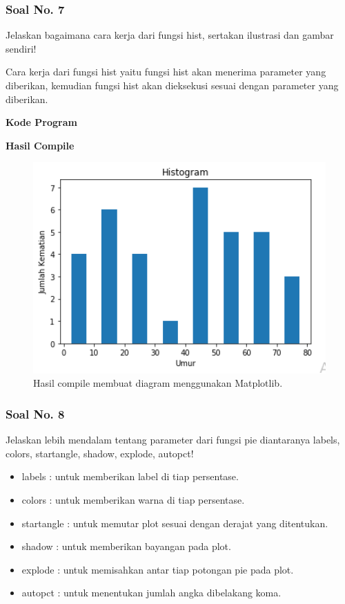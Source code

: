 \subsubsection{Soal No. 7}
\hfill \break
Jelaskan bagaimana cara kerja dari fungsi hist, sertakan ilustrasi dan gambar sendiri!

\hfill \break
Cara kerja dari fungsi hist yaitu fungsi hist akan menerima parameter yang diberikan, kemudian fungsi hist akan dieksekusi sesuai dengan parameter yang diberikan.

\hfill \break
\textbf{Kode Program}



\hfill \break
\textbf{Hasil Compile}

\begin{figure}[H]
	\includegraphics[width=12cm]{figures/6/1174086/histogram.png}
	\centering
	\caption{Hasil compile membuat diagram menggunakan Matplotlib.}
\end{figure}

\subsubsection{Soal No. 8}
\hfill \break
 Jelaskan lebih mendalam tentang parameter dari fungsi pie diantaranya labels, colors, startangle, shadow, explode, autopct!
 
 
 \begin{itemize}
 	\item labels : untuk memberikan label di tiap persentase.
 	\item colors : untuk memberikan warna di tiap persentase.
 	\item startangle : untuk memutar plot sesuai dengan derajat yang ditentukan.
 	\item shadow : untuk memberikan bayangan pada plot.
 	\item explode : untuk memisahkan antar tiap potongan pie pada plot.
 	\item autopct : untuk menentukan jumlah angka dibelakang koma.
 \end{itemize}
 



